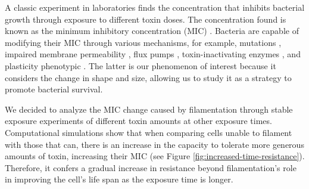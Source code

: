 \documentclass[a4paper, nobind]{templates/ociamthesis}
\begin{document}
A classic experiment in laboratories finds the concentration that inhibits bacterial growth through exposure to different toxin doses. The concentration found is known as the minimum inhibitory concentration (MIC) \autocite{andrewsDeterminationMinimumInhibitory2002}. Bacteria are capable of modifying their MIC through various mechanisms, for example, mutations \autocite{lambertBacterialResistanceAntibiotics2005}, impaired membrane permeability \autocite{satoOuterMembranePermeability1991}, flux pumps \autocite{webberImportanceEffluxPumps2003}, toxin-inactivating enzymes \autocite{wrightBacterialResistanceAntibiotics2005}, and plasticity phenotypic \autocite{justiceMorphologicalPlasticityBacterial2008}. The latter is our phenomenon of interest because it considers the change in shape and size, allowing us to study it as a strategy to promote bacterial survival.

We decided to analyze the MIC change caused by filamentation through stable exposure experiments of different toxin amounts at other exposure times. Computational simulations show that when comparing cells unable to filament with those that can, there is an increase in the capacity to tolerate more generous amounts of toxin, increasing their MIC (see Figure \ref{fig:increased-time-resistance}). Therefore, it confers a gradual increase in resistance beyond filamentation's role in improving the cell's life span as the exposure time is longer.
\end{document}
